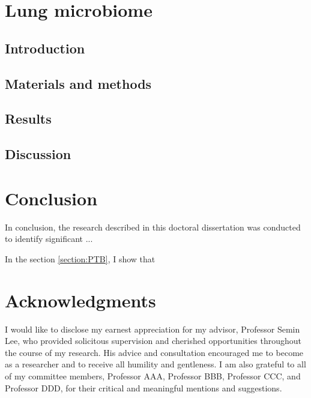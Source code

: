 \documentclass[11pt, a4paper, onecolumn, oneside]{report}
\begin{document}
    \section{Lung microbiome}
        \subsection{Introduction}
        \clearpage

        \subsection{Materials and methods}
        \clearpage

        \subsection{Results}
        \clearpage

        \subsection{Discussion}
        \clearpage
    \newpage

    \section{Conclusion}
        \label{section:conclusion}
        In conclusion, the research described in this doctoral dissertation was conducted to identify significant ...

        In the section \ref{section:PTB}, I show that
        \newpage

    
    
    \clearpage

    \section*{\hfill \Large Acknowledgments \hfill}
        I would like to disclose my earnest appreciation for my advisor, Professor Semin Lee, who provided solicitous supervision and cherished opportunities throughout the course of my research. His advice and consultation encouraged me to become as a researcher and to receive all humility and gentleness. I am also grateful to all of my committee members, Professor AAA, Professor BBB, Professor CCC, and Professor DDD, for their critical and meaningful mentions and suggestions.
\end{document}
